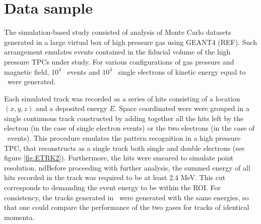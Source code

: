 \documentclass{JINST}
\begin{document}
\section{Data sample}\label{sec.track}

The simulation-based study consisted of analysis of Monte Carlo datasets generated in a large virtual box of high pressure gas using GEANT4 (REF). Such arrangement emulates events contained in the fiducial volume of the high pressure TPCs under study. For various configurations of gas pressure and magnetic field, $10^4$ \bbonu\ events and $10^4$~ single electrons of kinetic energy equal to \Qbb\  were generated.  

Each simulated track was recorded as a series of hits consisting of a location $(x,y,z)$ and a deposited energy $E$.  Space coordinated were were grouped in a single continuous track constructed by adding together all the hits left by the electron (in the case of single electron events) or the two electrons (in the case of \bbonu\ events). This procedure emulates the pattern recognition in a high pressure TPC, that reconstructs as a single track both single and double electrons (see figure \ref{fig.ETRK2}). Furthermore, the hits were smeared to simulate point resolution. ndBefore proceeding with further analysis, the summed energy of all hits recorded in the track was required to be at least 2.4 MeV. This cut corresponds to demanding the event energy to be within the ROI. For consistency, the tracks generated in \SEHF\ were generated with the same energies, so that one could compare the performance of the two gases for tracks of identical momenta. 
\end{document}
